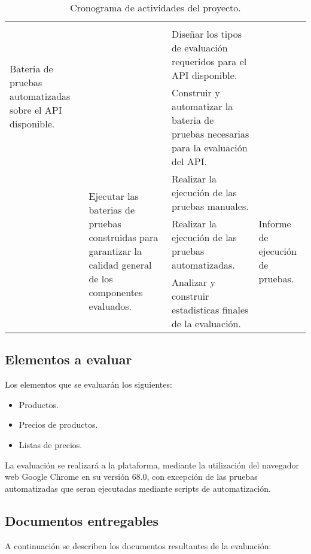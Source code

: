 \begin{sidewaystable}
\begin{tabular}{|l|l|p{6.5cm}|l|}
\multirow{3}{4.0cm}{Bateria de pruebas automatizadas sobre el API disponible.} \\
\cline{3-3}
& & Diseñar los tipos de evaluación requeridos para el API disponible. & \\
\cline{3-3}
& & Construir y automatizar la bateria de pruebas necesarias para la evaluación del API. & \\
\cline{2-4}
& \multirow{3}{4.0cm}{Ejecutar las baterias de pruebas construidas para garantizar la calidad general de los componentes evaluados.} &
Realizar la ejecución de las pruebas manuales. &
\multirow{3}{4.0cm}{Informe de ejecución de pruebas.} \\
\cline{3-3}
& & Realizar la ejecución de las pruebas automatizadas. & \\
\cline{3-3}
& & Analizar y construir estadisticas finales de la evaluación. & \\
\hline
\end{tabular}
\caption{Cronograma de actividades del proyecto.}
\label{cronograma}
\end{sidewaystable}

\subsection{Elementos a evaluar}
Los elementos que se evaluarán los siguientes:

\begin{itemize}
\item Productos.
\item Precios de productos.
\item Listas de precios.
\end{itemize}

La evaluación se realizará a la plataforma, mediante la utilización del navegador
web Google Chrome en su versión 68.0, con excepción de las pruebas automatizadas
que seran ejecutadas mediante scripts de automatización.

\subsection{Documentos entregables}
A continuación se describen los documentos resultantes de la evaluación:

